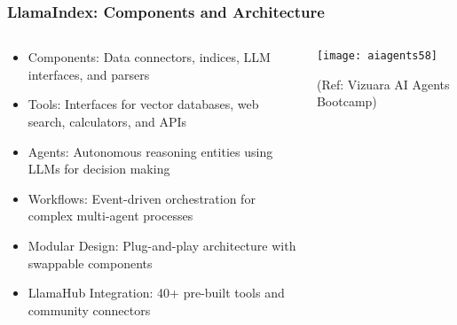 \begin{frame}[fragile]\frametitle{LlamaIndex: Components and Architecture}
\begin{columns}
    \begin{column}[T]{0.6\linewidth}
      \begin{itemize}
		\item Components: Data connectors, indices, LLM interfaces, and parsers
		\item Tools: Interfaces for vector databases, web search, calculators, and APIs
		\item Agents: Autonomous reasoning entities using LLMs for decision making
		\item Workflows: Event-driven orchestration for complex multi-agent processes
		\item Modular Design: Plug-and-play architecture with swappable components
		\item LlamaHub Integration: 40+ pre-built tools and community connectors
	  \end{itemize}
    \end{column}
    \begin{column}[T]{0.4\linewidth}
		\begin{center}
		\texttt{[image: aiagents58]}
		
		{\tiny (Ref: Vizuara AI Agents Bootcamp)}
		
		\end{center}	
    \end{column}
  \end{columns}
\end{frame}

